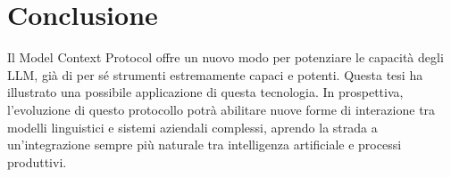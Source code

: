 \newpage
\section{Conclusione}
Il Model Context Protocol offre un nuovo modo per potenziare le capacità degli LLM, già di per sé strumenti estremamente capaci e potenti.
Questa tesi ha illustrato una possibile applicazione di questa tecnologia.
In prospettiva, l'evoluzione di questo protocollo potrà abilitare nuove forme di interazione tra modelli linguistici e sistemi aziendali 
complessi, aprendo la strada a un'integrazione sempre più naturale tra intelligenza artificiale e processi produttivi.